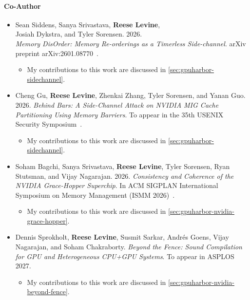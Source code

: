 \paragraph{Co-Author}
\begin{itemize}
  \item Sean Siddens, Sanya Srivastava, \textbf{Reese Levine},\\
  Josiah Dykstra, and Tyler Sorensen. 2026.\\
  \textit{Memory DisOrder: Memory Re-orderings as a Timerless Side-channel}. arXiv preprint arXiv:2601.08770~\cite{siddens2026disorder}.
  \begin{itemize}
    \item My contributions to this work are discussed in \mysec\ref{sec:gpuharbor-sidechannel}.
  \end{itemize}

  \item Cheng Gu, \textbf{Reese Levine}, Zhenkai Zhang, Tyler Sorensen, and Yanan Guo. 2026. \textit{Behind Bars: A Side-Channel Attack on NVIDIA MIG Cache Partitioning Using Memory Barriers}. To appear in the 35th USENIX Security Symposium~\cite{gu2026behindbars}.
  \begin{itemize}
    \item My contributions to this work are discussed in \mysec\ref{sec:gpuharbor-sidechannel}.
  \end{itemize}

  \item Soham Bagchi, Sanya Srivastava, \textbf{Reese Levine}, Tyler Sorensen, Ryan Stutsman, and Vijay Nagarajan. 2026. \textit{Consistency and Coherence of the NVIDIA Grace-Hopper Superchip}. In ACM SIGPLAN International Symposium on Memory Management (ISMM 2026)~\cite{bagchi2026gh}.
  \begin{itemize}
    \item My contributions to this work are discussed in \mysec\ref{sec:gpuharbor-nvidia-grace-hopper}.
  \end{itemize}

  \item Dennis Sprokholt, \textbf{Reese Levine}, Susmit Sarkar, Andr\'es Goens, Vijay Nagarajan, and Soham Chakraborty. \textit{Beyond the Fence: Sound Compilation for GPU and Heterogeneous CPU+GPU Systems}. To appear in ASPLOS 2027.
  \begin{itemize}
    \item My contributions to this work are discussed in \mysec\ref{sec:gpuharbor-nvidia-beyond-fence}.
  \end{itemize}

\end{itemize}

